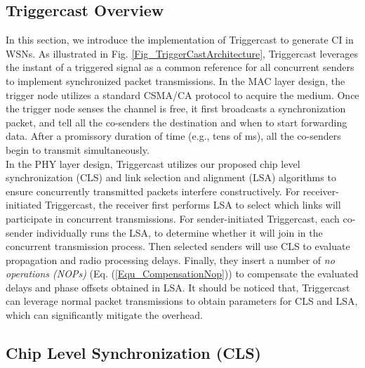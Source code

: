 \documentclass[conference]{IEEEtran}
\begin{document}
\subsection{Triggercast Overview}
\indent In this section, we introduce the implementation of Triggercast to generate CI in WSNs. As illustrated in Fig. \ref{Fig_TriggerCastArchitecture}, Triggercast leverages the instant of a triggered signal as a common reference for all concurrent senders to implement synchronized packet transmissions.
In the MAC layer design, the trigger node utilizes a standard CSMA/CA protocol to acquire the medium.
Once the trigger node senses the channel is free, it first broadcasts a synchronization packet, and tell all the co-senders the destination and when to start forwarding data.
After a promissory duration of time (e.g., tens of ms), all the co-senders begin to transmit simultaneously.\\
\indent In the PHY layer design, Triggercast utilizes our proposed chip level synchronization (CLS) and link selection and alignment (LSA) algorithms to ensure concurrently transmitted packets interfere constructively. For receiver-initiated Triggercast, the receiver first performs LSA to select which links will participate in concurrent transmissions.
For sender-initiated Triggercast, each co-sender individually runs the LSA, to determine whether it will join in the concurrent transmission process.
Then selected senders will use CLS to evaluate propagation and radio processing delays.
Finally, they insert a number of \emph{no operations (NOPs)} (Eq. (\ref{Equ_CompensationNop})) to compensate the evaluated delays and phase offsets obtained in LSA.
It should be noticed that, Triggercast can leverage normal packet transmissions to obtain parameters for CLS and LSA, which can significantly mitigate the overhead.
\subsection{Chip Level Synchronization (CLS)}
\label{Sec_CLS}
\end{document}
